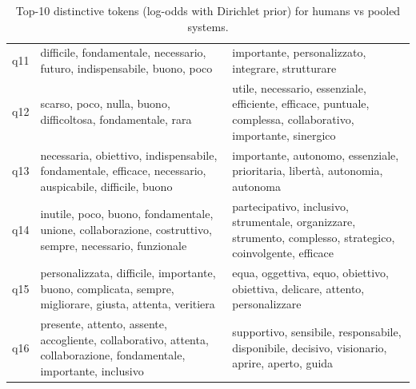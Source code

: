 \begin{table}[t]
\begin{tabularx}{\linewidth}{l p{7cm} p{7cm}}
q11 & difficile, fondamentale, necessario, futuro, indispensabile, buono, poco & importante, personalizzato, integrare, strutturare \\
q12 & scarso, poco, nulla, buono, difficoltosa, fondamentale, rara & utile, necessario, essenziale, efficiente, efficace, puntuale, complessa, collaborativo, importante, sinergico \\
q13 & necessaria, obiettivo, indispensabile, fondamentale, efficace, necessario, auspicabile, difficile, buono & importante, autonomo, essenziale, prioritaria, libertà, autonomia, autonoma \\
q14 & inutile, poco, buono, fondamentale, unione, collaborazione, costruttivo, sempre, necessario, funzionale & partecipativo, inclusivo, strumentale, organizzare, strumento, complesso, strategico, coinvolgente, efficace \\
q15 & personalizzata, difficile, importante, buono, complicata, sempre, migliorare, giusta, attenta, veritiera & equa, oggettiva, equo, obiettivo, obiettiva, delicare, attento, personalizzare \\
q16 & presente, attento, assente, accogliente, collaborativo, attenta, collaborazione, fondamentale, importante, inclusivo & supportivo, sensibile, responsabile, disponibile, decisivo, visionario, aprire, aperto, guida \\
\bottomrule
\end{tabularx}
\caption{Top-10 distinctive tokens (log-odds with Dirichlet prior) for humans vs pooled systems.}
\label{tab:keyness-top10}
\end{table}
